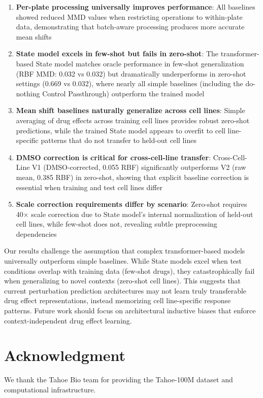 \documentclass[conference]{IEEEtran}
\begin{document}
\begin{enumerate}
    \item \textbf{Per-plate processing universally improves performance}: All baselines showed reduced MMD values when restricting operations to within-plate data, demonstrating that batch-aware processing produces more accurate mean shifts

    \item \textbf{State model excels in few-shot but fails in zero-shot}: The transformer-based State model matches oracle performance in few-shot generalization (RBF MMD: 0.032 vs 0.032) but dramatically underperforms in zero-shot settings (0.669 vs 0.032), where nearly all simple baselines (including the do-nothing Control Passthrough) outperform the trained model

    \item \textbf{Mean shift baselines naturally generalize across cell lines}: Simple averaging of drug effects across training cell lines provides robust zero-shot predictions, while the trained State model appears to overfit to cell line-specific patterns that do not transfer to held-out cell lines

    \item \textbf{DMSO correction is critical for cross-cell-line transfer}: Cross-Cell-Line V1 (DMSO-corrected, 0.055 RBF) significantly outperforms V2 (raw mean, 0.385 RBF) in zero-shot, showing that explicit baseline correction is essential when training and test cell lines differ

    \item \textbf{Scale correction requirements differ by scenario}: Zero-shot requires 40× scale correction due to State model's internal normalization of held-out cell lines, while few-shot does not, revealing subtle preprocessing dependencies
\end{enumerate}

Our results challenge the assumption that complex transformer-based models universally outperform simple baselines. While State models excel when test conditions overlap with training data (few-shot drugs), they catastrophically fail when generalizing to novel contexts (zero-shot cell lines). This suggests that current perturbation prediction architectures may not learn truly transferable drug effect representations, instead memorizing cell line-specific response patterns. Future work should focus on architectural inductive biases that enforce context-independent drug effect learning.

\section*{Acknowledgment}

We thank the Tahoe Bio team for providing the Tahoe-100M dataset and computational infrastructure.
\end{document}
